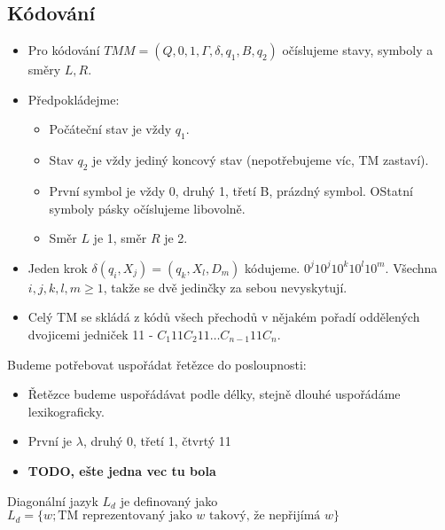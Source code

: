 \documentclass[../main.tex]{subfiles}
\begin{document}
\subsection{Kódování}
\begin{itemize}
    \item Pro kódování $TM M = (Q,{0,1},\Gamma,\delta,q_1,B,{q_2})$ očíslujeme stavy, symboly a směry $L,R$.
    \item Předpokládejme:
    \begin{itemize}
        \item Počáteční stav je vždy $q_1$.
        \item Stav $q_2$ je vždy jediný koncový stav (nepotřebujeme víc, TM zastaví).
        \item První symbol je vždy 0, druhý 1, třetí B, prázdný symbol. OStatní symboly pásky očíslujeme libovolně.
        \item Směr $L$ je 1, směr $R$ je 2.
    \end{itemize}
    \item Jeden krok $\delta(q_i,X_j) = (q_k,X_l,D_m)$ kódujeme. $0^j10^j10^k10^l10^m$. Všechna $i,j,k,l,m \geq 1$, takže se dvě jedinčky za sebou nevyskytují.
    \item Celý TM se skládá z kódů všech přechodů v nějakém pořadí oddělených dvojicemi jedniček 11 - $C_1 11 C_2 11 \dots C_{n-1} 11 C_n$.
\end{itemize}
Budeme potřebovat uspořádat řetězce do posloupnosti:
\begin{itemize}
    \item Řetězce budeme uspořádávat podle délky, stejně dlouhé uspořádáme lexikograficky.
    \item První je $\lambda$, druhý 0, třetí 1, čtvrtý 11
    \item \textbf{TODO, ešte jedna vec tu bola}
\end{itemize}
\begin{definition}
    Diagonální jazyk $L_d$ je definovaný jako $L_d = \{w; \text{TM reprezentovaný jako } w \text{ takový, že nepřijímá }w\}$
\end{definition}
\end{document}
